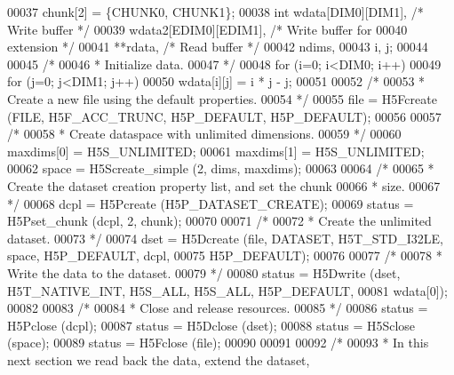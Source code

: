 \begin{DoxyCode}
00037                     chunk[2] = \{CHUNK0, CHUNK1\};
00038     \textcolor{keywordtype}{int}             wdata[DIM0][DIM1],          \textcolor{comment}{/* Write buffer */}
00039                     wdata2[EDIM0][EDIM1],       \textcolor{comment}{/* Write buffer for}
00040 \textcolor{comment}{                                                   extension */}
00041                     **rdata,                    \textcolor{comment}{/* Read buffer */}
00042                     ndims,
00043                     i, j;
00044 
00045     \textcolor{comment}{/*}
00046 \textcolor{comment}{     * Initialize data.}
00047 \textcolor{comment}{     */}
00048     \textcolor{keywordflow}{for} (i=0; i<DIM0; i++)
00049         \textcolor{keywordflow}{for} (j=0; j<DIM1; j++)
00050             wdata[i][j] = i * j - j;
00051 
00052     \textcolor{comment}{/*}
00053 \textcolor{comment}{     * Create a new file using the default properties.}
00054 \textcolor{comment}{     */}
00055     file = H5Fcreate (FILE, H5F\_ACC\_TRUNC, H5P\_DEFAULT, H5P\_DEFAULT);
00056 
00057     \textcolor{comment}{/*}
00058 \textcolor{comment}{     * Create dataspace with unlimited dimensions.}
00059 \textcolor{comment}{     */}
00060     maxdims[0] = H5S\_UNLIMITED;
00061     maxdims[1] = H5S\_UNLIMITED;
00062     space = H5Screate\_simple (2, dims, maxdims);
00063 
00064     \textcolor{comment}{/*}
00065 \textcolor{comment}{     * Create the dataset creation property list, and set the chunk}
00066 \textcolor{comment}{     * size.}
00067 \textcolor{comment}{     */}
00068     dcpl = H5Pcreate (H5P\_DATASET\_CREATE);
00069     status = H5Pset\_chunk (dcpl, 2, chunk);
00070 
00071     \textcolor{comment}{/*}
00072 \textcolor{comment}{     * Create the unlimited dataset.}
00073 \textcolor{comment}{     */}
00074     dset = H5Dcreate (file, DATASET, H5T\_STD\_I32LE, space, H5P\_DEFAULT, dcpl,
00075                 H5P\_DEFAULT);
00076 
00077     \textcolor{comment}{/*}
00078 \textcolor{comment}{     * Write the data to the dataset.}
00079 \textcolor{comment}{     */}
00080     status = H5Dwrite (dset, H5T\_NATIVE\_INT, H5S\_ALL, H5S\_ALL, H5P\_DEFAULT,
00081                 wdata[0]);
00082 
00083     \textcolor{comment}{/*}
00084 \textcolor{comment}{     * Close and release resources.}
00085 \textcolor{comment}{     */}
00086     status = H5Pclose (dcpl);
00087     status = H5Dclose (dset);
00088     status = H5Sclose (space);
00089     status = H5Fclose (file);
00090 
00091 
00092     \textcolor{comment}{/*}
00093 \textcolor{comment}{     * In this next section we read back the data, extend the dataset,}

\end{DoxyCode}
